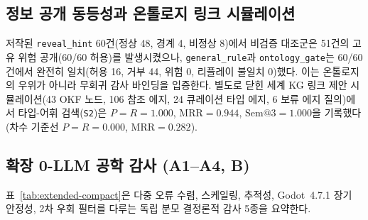 \subsection{정보 공개 동등성과 온톨로지 링크 시뮬레이션}
저작된 \texttt{reveal\_hint} 60건(정상 48, 경계 4, 비정상 8)에서 비검증 대조군은 51건의 고유 위험 공개(60/60 허용)를 발생시켰으나, \texttt{general\_rule}과 \texttt{ontology\_gate}는 60/60건에서 완전히 일치(허용 16, 거부 44, 위험 0, 리플레이 불일치 0)했다. 이는 온톨로지의 우위가 아니라 무회귀 감사 바인딩을 입증한다. 별도로 닫힌 세계 KG 링크 제안 시뮬레이션(43 OKF 노드, 106 참조 에지, 24 큐레이션 타입 에지, 6 보류 에지 질의)에서 타입-어휘 검색(\texttt{S2})은 $P{=}R{=}1.000$, $\mathrm{MRR}{=}0.944$, $\mathrm{Sem@3}{=}1.000$을 기록했다(차수 기준선 $P{=}R{=}0.000$, $\mathrm{MRR}{=}0.282$).

\subsection{확장 0-LLM 공학 감사 (A1--A4, B)}
표~\ref{tab:extended-compact}은 다중 오류 수렴, 스케일링, 추적성, Godot~4.7.1 장기 안정성, 2차 우회 필터를 다루는 독립 분모 결정론적 감사 5종을 요약한다.

